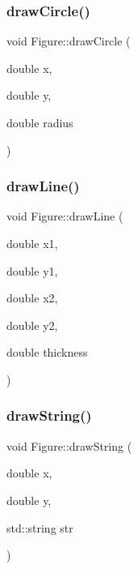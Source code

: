 \subsubsection{\texorpdfstring{draw\+Circle()}{drawCircle()}}
{\footnotesize\ttfamily void Figure\+::draw\+Circle (\begin{DoxyParamCaption}\item[{double}]{x,  }\item[{double}]{y,  }\item[{double}]{radius }\end{DoxyParamCaption})}

\mbox{\label{classFigure_ad5edf6262504de7c3c7eff6eb8be3c3e}} 
\subsubsection{\texorpdfstring{draw\+Line()}{drawLine()}}
{\footnotesize\ttfamily void Figure\+::draw\+Line (\begin{DoxyParamCaption}\item[{double}]{x1,  }\item[{double}]{y1,  }\item[{double}]{x2,  }\item[{double}]{y2,  }\item[{double}]{thickness }\end{DoxyParamCaption})}

\mbox{\label{classFigure_a8d06d9d1a75b58c6f40881c0737bc5e2}} 
\subsubsection{\texorpdfstring{draw\+String()}{drawString()}}
{\footnotesize\ttfamily void Figure\+::draw\+String (\begin{DoxyParamCaption}\item[{double}]{x,  }\item[{double}]{y,  }\item[{std\+::string}]{str }\end{DoxyParamCaption})}

\mbox{\label{classFigure_a6f239679543a9154ca1b6523094f7eae}} 

